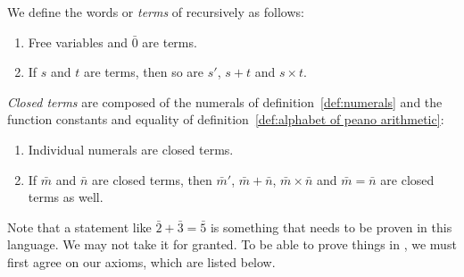 \documentclass[11pt,a4paper]{article}
\begin{document}
\begin{definition}[Terms of \PA{}]\label{def:terms of peano arithmetic}
    We define the words or \emph{terms} of \PA{} recursively as follows:
    \begin{enumerate}
        \item
            Free variables and \(\bar0\) are terms.
        \item
            If \(s\) and \(t\) are terms, then so are \(s'\),
            \(s+t\) and \(s\times t\).
    \end{enumerate}
\end{definition}
\begin{definition}\label{def:closed terms of peano arithmetic}
    \emph{Closed terms} are composed of the numerals of definition~\ref{def:numerals}
    and the function constants and equality of definition~\ref{def:alphabet of peano arithmetic}:
    \begin{enumerate}
        \item
            Individual numerals are closed terms.
        \item
            If \(\bar m\) and \(\bar n\) are closed terms,
            then \(\bar m '\), \(\bar m +\bar n\), \(\bar m\times\bar n\)
            and \(\bar m = \bar n\) are closed terms as well.
    \end{enumerate}
\end{definition}

Note that a statement like \(\bar2+\bar3=\bar5\) is something that needs to be
proven in this language. We may not take it for granted. To be able to prove
things in \PA{}, we must first agree on our axioms, which are listed below.
\end{document}
